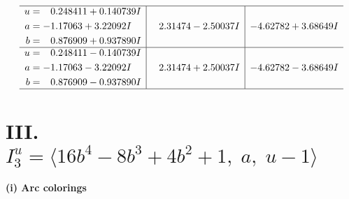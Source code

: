 \documentclass[1p]{elsarticle_modified}
\theoremstyle{definition}
\begin{document}
$$\begin{array}{c|c|c}
 \hline 
\begin{aligned}
u &= \phantom{-}0.248411 + 0.140739 I \\
a &= -1.17063 + 3.22092 I \\
b &= \phantom{-}0.876909 + 0.937890 I\end{aligned}
 & \phantom{-}2.31474 - 2.50037 I & -4.62782 + 3.68649 I \\ \hline\begin{aligned}
u &= \phantom{-}0.248411 - 0.140739 I \\
a &= -1.17063 - 3.22092 I \\
b &= \phantom{-}0.876909 - 0.937890 I\end{aligned}
 & \phantom{-}2.31474 + 2.50037 I & -4.62782 - 3.68649 I\\
 \hline 
 \end{array}$$\newpage\newpage\renewcommand{\arraystretch}{1}
\centering \section*{III. $I^u_{3}= \langle 16 b^4-8 b^3+4 b^2+1,\;a,\;u-1 \rangle$}
\flushleft \textbf{(i) Arc colorings}\\
\end{document}
